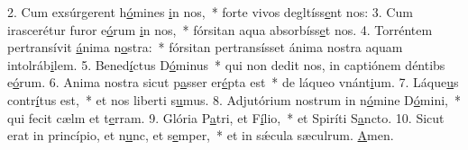 2. Cum exsúrgerent h\uline{ó}mines \uline{i}n nos,~* forte vivos degltíss\uline{e}nt nos:
3. Cum irascerétur furor e\uline{ó}rum \uline{i}n nos,~* fórsitan aqua absorbíss\uline{e}t nos.
4. Torréntem pertransívit \uline{á}nima n\uline{o}stra:~* fórsitan pertransísset ánima nostra aquam intolráb\uline{i}lem.
5. Bened\uline{í}ctus D\uline{ó}minus~* qui non dedit nos, in captiónem déntibs e\uline{ó}rum.
6. Anima nostra sicut p\uline{a}sser er\uline{é}pta est~* de láqueo vnánt\uline{i}um.
7. Láque\uline{u}s contr\uline{í}tus est,~* et nos liberti s\uline{u}mus.
8. Adjutórium nostrum in n\uline{ó}mine D\uline{ó}mini,~* qui fecit cælm et t\uline{e}rram.
9. Glória P\uline{a}tri, et F\uline{í}lio,~* et Spiríti S\uline{a}ncto.
10. Sicut erat in princípio, et n\uline{u}nc, et s\uline{e}mper,~* et in sǽcula sæculrum. \uline{A}men.
